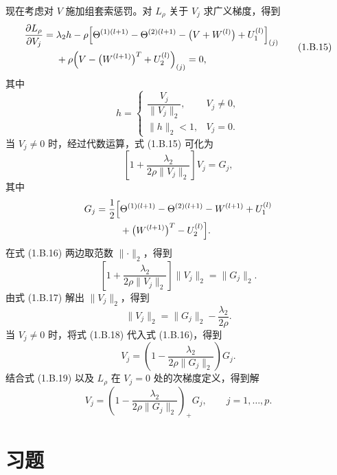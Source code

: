 现在考虑对 $V$ 施加组套索惩罚。对 $L_\rho$ 关于 $V_j$ 求广义梯度，得到
\begin{equation}
\begin{aligned}
\frac{\partial L_\rho}{\partial V_j}
={}&\lambda_2h-\rho\Bigl[\Theta^{(1)(l+1)}-\Theta^{(2)(l+1)}
-\bigl(V+W^{(l)}\bigr)+U_1^{(l)}\Bigr]_{(j)} \\
&+\rho\Bigl(V-\bigl(W^{(l+1)}\bigr)^T+U_2^{(l)}\Bigr)_{(j)}=0,
\end{aligned}
\tag{1.B.15}
\end{equation}
其中
\[
h=\begin{cases}
\dfrac{V_j}{\lVert V_j\rVert_2},&V_j\ne0,\\[6pt]
\lVert h\rVert_2<1,&V_j=0.
\end{cases}
\]
当 $V_j\ne0$ 时，经过代数运算，式 (1.B.15) 可化为
\begin{equation}
\left[1+\frac{\lambda_2}{2\rho\lVert V_j\rVert_2}\right]V_j=G_j,
\tag{1.B.16}
\end{equation}
其中
\[
\begin{aligned}
G_j=\frac12\Bigl[{}&\Theta^{(1)(l+1)}-\Theta^{(2)(l+1)}-W^{(l+1)}+U_1^{(l)} \\
&+\bigl(W^{(l+1)}\bigr)^T-U_2^{(l)}\Bigr].
\end{aligned}
\]
在式 (1.B.16) 两边取范数 $\lVert\cdot\rVert_2$，得到
\begin{equation}
\left[1+\frac{\lambda_2}{2\rho\lVert V_j\rVert_2}\right]\lVert V_j\rVert_2
=\lVert G_j\rVert_2.
\tag{1.B.17}
\end{equation}
由式 (1.B.17) 解出 $\lVert V_j\rVert_2$，得到
\begin{equation}
\lVert V_j\rVert_2=\lVert G_j\rVert_2-\frac{\lambda_2}{2\rho}.
\tag{1.B.18}
\end{equation}
当 $V_j\ne0$ 时，将式 (1.B.18) 代入式 (1.B.16)，得到
\begin{equation}
V_j=\left(1-\frac{\lambda_2}{2\rho\lVert G_j\rVert_2}\right)G_j.
\tag{1.B.19}
\end{equation}
结合式 (1.B.19) 以及 $L_\rho$ 在 $V_j=0$ 处的次梯度定义，得到解
\begin{equation}
V_j=\left(1-\frac{\lambda_2}{2\rho\lVert G_j\rVert_2}\right)_+G_j,
\qquad j=1,\ldots,p.
\tag{1.B.20}
\end{equation}

\FloatBarrier
\section*{习题}

